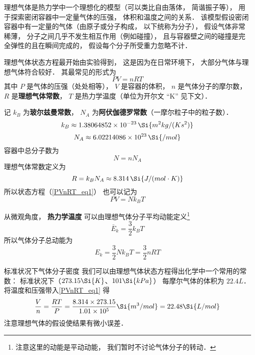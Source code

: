 

理想气体是热力学中一个理想化的模型（可以类比自由落体， 简谐振子等）， 用于探索密闭容器中一定量气体的压强， 体积和温度之间的关系． 该模型假设密闭容器中有一定量的气体（由原子或分子构成， 以下统称为分子）， 假设气体非常稀薄， 分子之间几乎不发生相互作用（例如碰撞）， 且与容器壁之间的碰撞是完全弹性的且在瞬间完成的， 假设每个分子所受重力忽略不计．

理想气体状态方程最开始由实验得到， 这是因为在日常环境下， 大部分气体与理想气体符合较好． 其最常见的形式为
\begin{equation}\label{PVnRT_eq1}
PV = nRT
\end{equation}
其中 $P$ 是气体的压强（处处相等）， $V$ 是容器的体积， $n$ 是气体分子的摩尔数， $R$ 是\textbf{理想气体常数}， $T$ 是热力学温度（单位为开尔文 “K” 见下文）．

记 $k_B$ 为\textbf{玻尔兹曼常数}， $N_A$ 为\textbf{阿伏伽德罗常数}（一摩尔粒子中的粒子数）．
\begin{equation}
k_B \approx 1.38064852 \times 10^{-23} \,\Si{m^2 kg / (K s^2)}
\end{equation}
\begin{equation}
N_A \approx 6.02214086 \times 10^{23} \,\Si{/mol}
\end{equation}
容器中总分子数为
\begin{equation}
N = n N_A
\end{equation}
理想气体常数定义为
\begin{equation}\label{PVnRT_eq2}
R = k_B N_A \approx 8.314 \,\Si{J / (mol \cdot K)}
\end{equation}
所以状态方程（\autoref{PVnRT_eq1}） 也可以记为
\begin{equation}\label{PVnRT_eq4}
PV = N k_B T
\end{equation}

从微观角度， \textbf{热力学温度} 可以由理想气体分子平均动能定义\footnote{注意这里的动能是平动动能， 我们暂时不讨论气体分子的转动．}
\begin{equation}\label{PVnRT_eq3}
\bar E_k = \frac32 k_B T
\end{equation}
所以气体分子总动能为
\begin{equation}\label{PVnRT_eq5}
E_k = \frac32 Nk_B T = \frac{3}{2}nRT
\end{equation}

\begin{example}{标准状况下气体分子密度}
我们可以由理想气体状态方程得出化学中一个常用的常数： 标准状况下（$273.15 \Si{K}$、$101 \Si{kPa}$） 每摩尔气体的体积为 $22.4L$． 将温度和压强带入\autoref{PVnRT_eq1} 得
\begin{equation}
\frac{V}{n} = \frac{RT}{P} = \frac{8.314 \times 273.15}{1.01\times 10^5}\Si{m^3/mol} = 22.48 \Si{L/mol}
\end{equation}
注意理想气体的假设使结果有微小误差．
\end{example}

